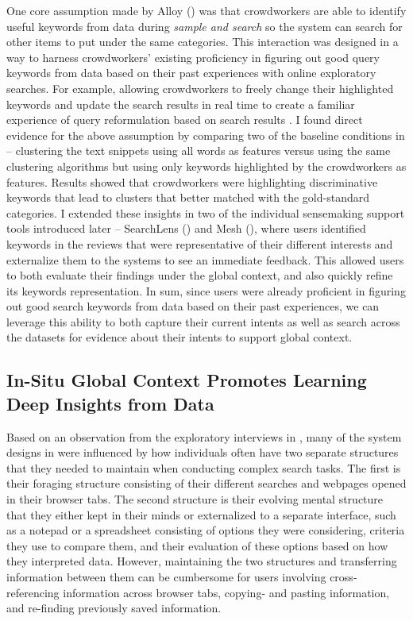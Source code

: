 One core assumption made by Alloy () was that crowdworkers are able to identify useful keywords from data during \emph{sample and search} so the system can search for other items to put under the same categories. This interaction was designed in a way to harness crowdworkers’ existing proficiency in figuring out good query keywords from data based on their past experiences with online exploratory searches. For example, allowing crowdworkers to freely change their highlighted keywords and update the search results in real time to create a familiar experience of query reformulation based on search results \cite{jansen2009patterns}. I found direct evidence for the above assumption by comparing two of the baseline conditions in  -- clustering the text snippets using all words as features versus using the same clustering algorithms but using only keywords highlighted by the crowdworkers as features. Results showed that crowdworkers were highlighting discriminative keywords that lead to clusters that better matched with the gold-standard categories. I extended these insights in two of the individual sensemaking support tools introduced later -- SearchLens () and Mesh (), where users identified keywords in the reviews that were representative of their different interests and externalize them to the systems to see an immediate feedback. This allowed users to both evaluate their findings under the global context, and also quickly refine its keywords representation. In sum, since users were already proficient in figuring out good search keywords from data based on their past experiences, we can leverage this ability to both capture their current intents as well as search across the datasets for evidence about their intents to support global context.


\subsection{In-Situ Global Context Promotes Learning Deep Insights from Data}

Based on an observation from the exploratory interviews in , many of the system designs in  were influenced by how individuals often have two separate structures that they needed to maintain when conducting complex search tasks. The first is their foraging structure consisting of their different searches and webpages opened in their browser tabs. The second structure is their evolving mental structure that they either kept in their minds or externalized to a separate interface, such as a notepad or a spreadsheet consisting of options they were considering, criteria they use to compare them, and their evaluation of these options based on how they interpreted data. However, maintaining the two structures and transferring information between them can be cumbersome for users involving cross-referencing information across browser tabs, copying- and pasting information, and re-finding previously saved information. 

